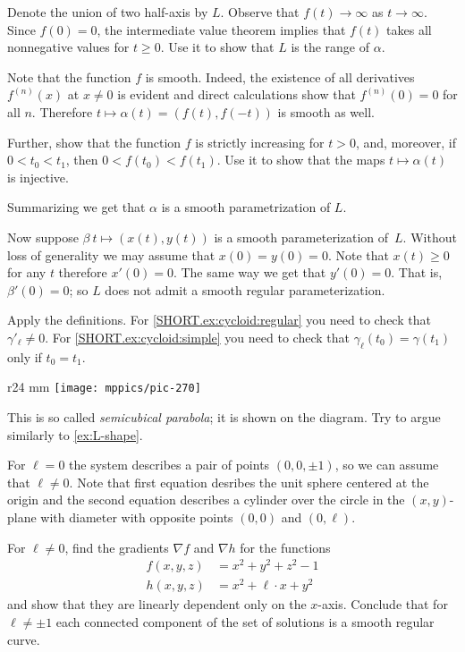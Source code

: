 Denote the union of two half-axis by $L$.
Observe that $f(t)\to\infty$ as $t\to \infty$.
Since $f(0)=0$, the intermediate value theorem implies that $f(t)$ takes all nonnegative values for $t\ge 0$.
Use it to show that $L$ is the range of $\alpha$.

Note that the function $f$
is smooth.
Indeed, the existence of all derivatives $f^{(n)}(x)$ at $x\ne 0$ is evident and direct calculations show that $f^{(n)}(0)=0$ for all $n$.
Therefore $t\mapsto \alpha(t)=(f(t),f(-t))$ is smooth as well.

Further, show that the function $f$ is strictly increasing for $t> 0$,
and, moreover, if $0<t_0<t_1$, then $0<f(t_0)<f(t_1)$.
Use it to show that the maps $t\mapsto \alpha(t)$ is injective.

Summarizing we get that $\alpha$ is a smooth parametrization of $L$. 

Now suppose $\beta\:t\mapsto (x(t),y(t))$ is a smooth parameterization of~$L$.
Without loss of generality we may assume that $x(0)=y(0)=0$.
Note that $x(t)\ge 0$ for any $t$ therefore $x'(0)=0$.
The same way we get that $y'(0)=0$.
That is, $\beta'(0)=0$;
so $L$ does not admit a smooth regular parameterization.

Apply the definitions.
For \ref{SHORT.ex:cycloid:regular} you need to check that $\gamma'_\ell\ne 0$.
For \ref{SHORT.ex:cycloid:simple} you need to check that $\gamma_\ell(t_0)=\gamma(t_1)$ only if $t_0=t_1$.

\begin{wrapfigure}{r}{24 mm}
\vskip-0mm
\centering
\texttt{[image: mppics/pic-270]}
\vskip0mm
\end{wrapfigure}

This is so called \emph{semicubical parabola}; it is shown on the diagram.
Try to argue similarly to \ref{ex:L-shape}.


For $\ell=0$ the system describes a pair of points $(0,0,\pm1)$, so we can assume that $\ell\ne 0$.
Note that first equation desribes the unit sphere centered at the origin
and the second equation describes a cylinder over the circle in the $(x,y)$-plane with diameter with opposite points $(0,0)$ and $(0,\ell)$.


For $\ell\ne 0$,
find the gradients $\nabla f$ and $\nabla h$ for the functions
\begin{align*}
 f(x,y,z)&=x^2+y^2+z^2-1
 \\
 h(x,y,z)&=x^2+\ell\cdot x+y^2
\end{align*}
and show that they are linearly dependent only on the $x$-axis.
Conclude that for $\ell\ne\pm 1$ each connected component of the set of solutions is a smooth regular curve.

